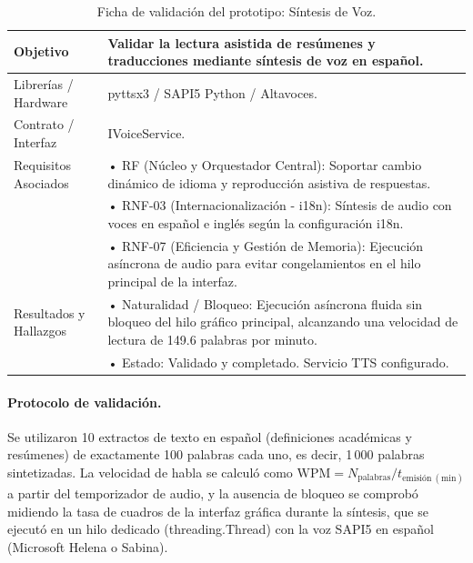 \begin{table}[H]
    \centering
    \caption{Ficha de validación del prototipo: Síntesis de Voz.}
    \label{tab:ficha_f25}
    \begin{tabular}{L{3.2cm} L{11.0cm}}
        \toprule
        Objetivo & Validar la lectura asistida de resúmenes y traducciones mediante síntesis de voz en español. \\ \midrule
        Librerías / Hardware & pyttsx3 / SAPI5 Python / Altavoces. \\ \midrule
        Contrato / Interfaz & IVoiceService. \\ \midrule
        Requisitos Asociados &
        • RF (Núcleo y Orquestador Central): Soportar cambio dinámico de idioma y reproducción asistiva de respuestas. \vspace{0.1cm} \\
        & • RNF-03 (Internacionalización - i18n): Síntesis de audio con voces en español e inglés según la configuración i18n. \vspace{0.1cm} \\
        & • RNF-07 (Eficiencia y Gestión de Memoria): Ejecución asíncrona de audio para evitar congelamientos en el hilo principal de la interfaz. \\ \midrule
        Resultados y Hallazgos &
        • Naturalidad / Bloqueo: Ejecución asíncrona fluida sin bloqueo del hilo gráfico principal, alcanzando una velocidad de lectura de 149.6 palabras por minuto. \vspace{0.1cm} \\
        & • Estado: Validado y completado. Servicio TTS configurado. \\ \bottomrule
    \end{tabular}
\end{table}
 
\paragraph{Protocolo de validación.} Se utilizaron 10 extractos de texto en español (definiciones académicas y resúmenes) de exactamente 100 palabras cada uno, es decir, 1\,000 palabras sintetizadas. La velocidad de habla se calculó como $\mathrm{WPM} = N_{\mathrm{palabras}} / t_{\mathrm{emisión\ (min)}}$ a partir del temporizador de audio, y la ausencia de bloqueo se comprobó midiendo la tasa de cuadros de la interfaz gráfica durante la síntesis, que se ejecutó en un hilo dedicado (threading.Thread) con la voz SAPI5 en español (Microsoft Helena o Sabina).
 
